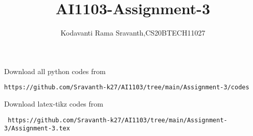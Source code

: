 \documentclass[journal,12pt,twocolumn]{IEEEtran}
\DeclareMathOperator*{\Res}{Res}
\begin{document}
\newcommand{\BEQA}{\begin{eqnarray}}
\newcommand{\EEQA}{\end{eqnarray}}
\newcommand{\define}{\stackrel{\triangle}{=}}

\raggedbottom
\setlength{\parindent}{0pt}
\providecommand{\mbf}{\mathbf}
\providecommand{\pr}[1]{\ensuremath{\Pr\left(#1\right)}}
\providecommand{\qfunc}[1]{\ensuremath{Q\left(#1\right)}}
\providecommand{\sbrak}[1]{\ensuremath{{}\left[#1\right]}}
\providecommand{\lsbrak}[1]{\ensuremath{{}\left[#1\right.}}
\providecommand{\rsbrak}[1]{\ensuremath{{}\left.#1\right]}}
\providecommand{\brak}[1]{\ensuremath{\left(#1\right)}}
\providecommand{\lbrak}[1]{\ensuremath{\left(#1\right.}}
\providecommand{\rbrak}[1]{\ensuremath{\left.#1\right)}}
\providecommand{\cbrak}[1]{\ensuremath{\left\{#1\right\}}}
\providecommand{\lcbrak}[1]{\ensuremath{\left\{#1\right.}}
\providecommand{\rcbrak}[1]{\ensuremath{\left.#1\right\}}}
\theoremstyle{remark}
\newtheorem{rem}{Remark}
\newcommand{\sgn}{\mathop{\mathrm{sgn}}}
\providecommand{\abs}[1]{\vert#1\vert}
\providecommand{\res}[1]{\Res\displaylimits_{#1}} 
\providecommand{\norm}[1]{\lVert#1\rVert}
\providecommand{\mtx}[1]{\mathbf{#1}}
\providecommand{\mean}[1]{E[ #1 ]}
\providecommand{\fourier}{\overset{\mathcal{F}}{ \rightleftharpoons}}
\providecommand{\system}{\overset{\mathcal{H}}{ \longleftrightarrow}}
\newcommand{\solution}{\noindent \textbf{Solution: }}
\newcommand{\cosec}{\,\text{cosec}\,}
\providecommand{\dec}[2]{\ensuremath{\overset{#1}{\underset{#2}{\gtrless}}}}
\newcommand{\myvec}[1]{\ensuremath{\begin{pmatrix}#1\end{pmatrix}}}
\newcommand{\mydet}[1]{\ensuremath{\begin{vmatrix}#1\end{vmatrix}}}
\makeatletter
{}
\makeatother
\let\StandardTheFigure\thefigure
\let\vec\mathbf
\renewcommand{\thefigure}{\theproblem}
\def\putbox#1#2#3{\makebox[0in][l]{\makebox[#1][l]{}\raisebox{\baselineskip}[0in][0in]{\raisebox{#2}[0in][0in]{#3}}}}
     \def\rightbox#1{\makebox[0in][r]{#1}}
     \def\centbox#1{\makebox[0in]{#1}}
     \def\topbox#1{\raisebox{-\baselineskip}[0in][0in]{#1}}
     \def\midbox#1{\raisebox{-0.5\baselineskip}[0in][0in]{#1}}
\vspace{3cm}
\title{AI1103-Assignment-3}
\author{Kodavanti Rama Sravanth,CS20BTECH11027}
\maketitle
\newpage
\bigskip
\renewcommand{\thefigure}{\theenumi}
\renewcommand{\thetable}{\theenumi}
Download all python codes from 
\begin{lstlisting}
https://github.com/Sravanth-k27/AI1103/tree/main/Assignment-3/codes
\end{lstlisting}
%
Download latex-tikz codes from 
%
\begin{lstlisting}
 https://github.com/Sravanth-k27/AI1103/tree/main/Assignment-3/Assignment-3.tex 
\end{lstlisting}
\end{document}

